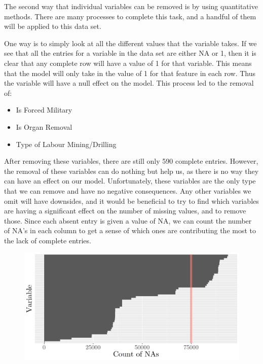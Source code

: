 \documentclass{article} %
\begin{document}
	The second way that individual variables can be removed is by using quantitative methods. There are many processes to complete this task, and a handful of them will be applied to this data set. 
	
	One way is to simply look at all the different values that the variable takes. If we see that all the entries for a variable in the data set are either NA or 1, then it is clear that any complete row will have a value of 1 for that variable. This means that the model will only take in the value of 1 for that feature in each row. Thus the variable will have a null effect on the model. This process led to the removal of:
	

	\begin{multicols}{2}
		\begin{itemize}
			\item Is Forced Military
			\item Is Organ Removal
			\item Type of Labour Mining/Drilling
		\end{itemize}
	\end{multicols}
	
	After removing these variables, there are still only 590 complete entries. However, the removal of these variables can do nothing but help us, as there is no way they can have an effect on our model. Unfortunately, these variables are the only type that we can remove and have no negative consequences. Any other variables we omit will have downsides, and it would be beneficial to try to find which variables are having a significant effect on the number of missing values, and to remove those. Since each absent entry is given a value of NA, we can count the number of NA's in each column to get a sense of which ones are contributing the most to the lack of complete entries.
	
	\begin{figure}[H]
		\includegraphics[width = \textwidth]{NABarplot}
	\end{figure}
	
\end{document}
